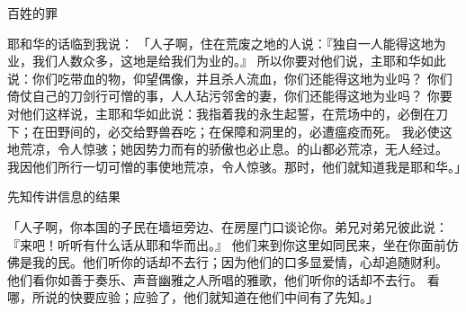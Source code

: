 {\par }{\SH 百姓的罪
\par }{\PP {}耶和华的话临到我说：
「人子啊，住在{}荒废之地的人说：『{}独自一人能得这地为业，我们人数众多，这地{}是给我们为业的。』
所以你要对他们说，主耶和华如此说：你们吃带血的物，仰望偶像，并且杀人流血，你们还能得这地为业吗？
你们倚仗自己的刀剑行可憎的事，人人玷污邻舍的妻，你们还能得这地为业吗？
你要对他们这样说，主耶和华如此说：我指着我的永生起誓，在荒场中的，必倒在刀下；在田野间的，必交给野兽吞吃；在保障和洞里的，必遭瘟疫而死。
我必使这地荒凉，令人惊骇；她因势力而有的骄傲也必止息。{}的山都必荒凉，无人经过。
我因他们所行一切可憎的事使地荒凉，令人惊骇。那时，他们就知道我是耶和华。」
\par }{\SH 先知传讲信息的结果
\par }{\PP {}「人子啊，你本国的子民在墙垣旁边、在房屋门口谈论你。弟兄对弟兄彼此说：『来吧！听听有什么话从耶和华而出。』
他们来到你这里如同民来{}，坐在你面前仿佛是我的民。他们听你的话却不去行；因为他们的口多显爱情，心却追随财利。
他们看你如善于奏乐、声音幽雅之人所唱的雅歌，他们听你的话却不去行。
看哪，所说的快要应验；应验了，他们就知道在他们中间有了先知。」

}
